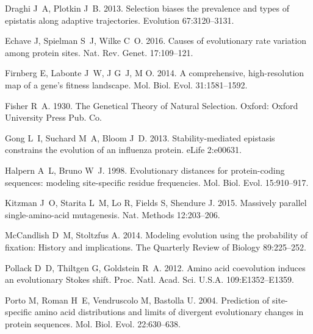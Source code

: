 \documentclass[11pt]{article}
\begin{document}
\begin{thebibliography}{38}
Draghi J~A, Plotkin J~B. 2013.
\newblock Selection biases the prevalence and types of epistatis along adaptive
  trajectories.
\newblock Evolution 67:3120--3131.

Echave J, Spielman S~J, Wilke C~O. 2016.
\newblock Causes of evolutionary rate variation among protein sites.
\newblock Nat. Rev. Genet. 17:109--121.

Firnberg E, Labonte J~W, J G~J, M O. 2014.
\newblock A comprehensive, high-resolution map of a gene’s fitness landscape.
\newblock Mol. Biol. Evol. 31:1581--1592.

Fisher R~A. 1930.
\newblock The Genetical Theory of Natural Selection.
\newblock Oxford: Oxford University Press Pub. Co.

Gong L~I, Suchard M~A, Bloom J~D. 2013.
\newblock Stability-mediated epistasis constrains the evolution of an influenza
  protein.
\newblock eLife 2:e00631.

Halpern A~L, Bruno W~J. 1998.
\newblock Evolutionary distances for protein-coding sequences: modeling
  site-specific residue frequencies.
\newblock Mol. Biol. Evol. 15:910--917.

Kitzman J~O, Starita L~M, Lo R, Fields S, Shendure J. 2015.
\newblock Massively parallel single-amino-acid mutagenesis.
\newblock Nat. Methods 12:203--206.

McCandlish D~M, Stoltzfus A. 2014.
\newblock Modeling evolution using the probability of fixation: History and
  implications.
\newblock The Quarterly Review of Biology 89:225--252.

Pollack D~D, Thiltgen G, Goldstein R~A. 2012.
\newblock Amino acid coevolution induces an evolutionary {Stokes} shift.
\newblock Proc. Natl. Acad. Sci. U.S.A. 109:E1352--E1359.

Porto M, Roman H~E, Vendruscolo M, Bastolla U. 2004.
\newblock Prediction of site-specific amino acid distributions and limits of
  divergent evolutionary changes in protein sequences.
\newblock Mol. Biol. Evol. 22:630--638.


\end{thebibliography}
\end{document}
